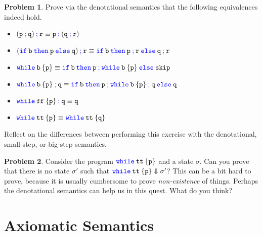 \documentclass[a4paper, 11pt]{article}
\theoremstyle{definition}
\newtheorem{problem}{Problem}
\newcommand{\blue}[1]{\textcolor{blue}{#1}}
\begin{document}
\begin{problem}
        Prove via the denotational semantics that the following equivalences
        indeed hold.
        \begin{itemize}
                \item $\mathtt{(p \> \blue{ ;} \> q) \> \blue{ ;} \> r} \equiv
                        \mathtt{p \> \blue{ ;} \> (q \> \blue{ ;} \> r)}$
                \item $\mathtt{(\blue{if} \> b \> \blue{then} \> p \> \blue{else} \> q) 
                      \> \blue{ ;} \> \prog{r}} \equiv 
                      \mathtt{\blue{ if} \> b \> \blue{then} \> p \> \blue{ ;} \> r \> 
                      \blue {else} \> q \> \blue {;} \> r}$ 
              \item $\mathtt{\blue {while} \> b \> \{ p \} } \equiv
                        \mathtt{\blue{if} \> b \> \blue{then} \> p \> {\blue ;} \>
                        \mathtt{\blue{ while} \> b \> \{ p \} } 
                        \> \blue{ else} \> skip}$
                \item $\mathtt{\blue{ while} \> b \> \{ p \} } \> \blue{ ;} \> \mathtt{q} \equiv
                      \mathtt{\blue{if} \> b \> \blue{ then} \> p \> \blue{ ;}  \> \blue{ while} \> b \> \{ p \}
                      \> \blue{ ;} \> q
                      \> \blue{ else} \> q}$
                \item $\mathtt{\blue{ while} \> ff \> \{ p \} \> \blue{ ;} \> q } \equiv \mathtt{q}$
                \item $\mathtt{\blue{ while} \> tt \> \{ p \} } \equiv
                      \mathtt{\blue{ while} \> tt \> \{ q \} }$
        \end{itemize}
        Reflect on the differences between performing this exercise with the
        denotational, small-step, or big-step semantics.
\end{problem}

\begin{problem}
        Consider the program $\mathtt{\blue{ while} \> tt \> \{ p \} }$ and a
        state $\sigma$. Can you prove that there is no state $\sigma'$ such
        that $\mathtt{\blue{ while} \> tt \> \{ p \} } \Downarrow \sigma'$?
        This can be a bit hard to prove, because it is usually cumbersome to
        prove \emph{non-existence} of things. Perhaps the denotational
        semantics can help us in this quest. What do you think?
\end{problem}

\section{Axiomatic Semantics}
\end{document}
